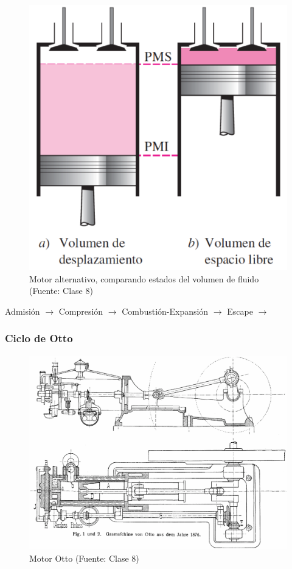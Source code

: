 \begin{multicols}{2}
            \begin{figure}[H]
            \caption{Motor alternativo, comparando estados del volumen de fluido (Fuente: Clase 8)}
            \label{fig:motor_alter_2}
                \includegraphics[width=.7\textwidth]{img/clases/motores_alternativos_2.png}
            \end{figure}
        \end{multicols}
        
            
            Admisión \(\rightarrow\) Compresión \(\rightarrow\) Combustión-Expansión \(\rightarrow\) Escape \(\rightarrow\)
        
        \subsubsection{Ciclo de Otto}
        
            
            \begin{figure}[H]
                \includegraphics[width=.6\textwidth]{img/clases/motor_otto.png}
                \caption{Motor Otto (Fuente: Clase 8)}
                \label{fig:motor_otto}
            \end{figure}
            
